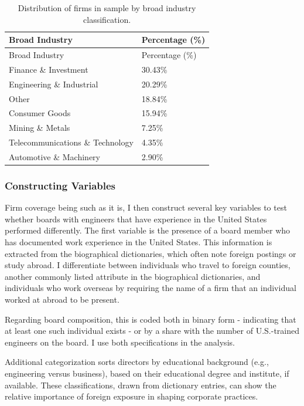 \documentclass[
]{article}
\begin{document}
\begin{longtable}[]{@{}ll@{}}
\caption{Distribution of firms in sample by broad industry
classification.}\label{tbl-industry-distribution}\tabularnewline
\toprule\noalign{}
Broad Industry & Percentage (\%) \\
\midrule\noalign{}
\endfirsthead
\toprule\noalign{}
Broad Industry & Percentage (\%) \\
\midrule\noalign{}
\endhead
\bottomrule\noalign{}
\endlastfoot
Finance \& Investment & 30.43\% \\
Engineering \& Industrial & 20.29\% \\
Other & 18.84\% \\
Consumer Goods & 15.94\% \\
Mining \& Metals & 7.25\% \\
Telecommunications \& Technology & 4.35\% \\
Automotive \& Machinery & 2.90\% \\
\end{longtable}

\subsubsection{Constructing Variables}\label{constructing-variables}

Firm coverage being such as it is, I then construct several key
variables to test whether boards with engineers that have experience in
the United States performed differently. The first variable is the
presence of a board member who has documented work experience in the
United States. This information is extracted from the biographical
dictionaries, which often note foreign postings or study abroad. I
differentiate between individuals who travel to foreign counties,
another commonly listed attribute in the biographical dictionaries, and
individuals who work overseas by requiring the name of a firm that an
individual worked at abroad to be present.

Regarding board composition, this is coded both in binary form -
indicating that at least one such individual exists - or by a share with
the number of U.S.-trained engineers on the board. I use both
specifications in the analysis.

Additional categorization sorts directors by educational background
(e.g., engineering versus business), based on their educational degree
and institute, if available. These classifications, drawn from
dictionary entries, can show the relative importance of foreign exposure
in shaping corporate practices.
\end{document}
